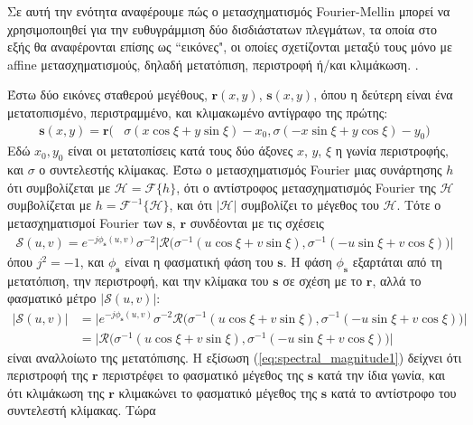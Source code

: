 Σε αυτή την ενότητα αναφέρουμε πώς ο μετασχηματισμός Fourier-Mellin μπορεί να
χρησιμοποιηθεί για την ευθυγράμμιση δύο δισδιάστατων πλεγμάτων, τα οποία στο
εξής θα αναφέρονται επίσης ως ``εικόνες", οι οποίες σχετίζονται μεταξύ τους μόνο
με affine μετασχηματισμούς, δηλαδή μετατόπιση, περιστροφή ή/και κλιμάκωση.
\cite{Casasent1976,Qin-ShengChen1994a,Reddy1996}.

Έστω δύο εικόνες σταθερού μεγέθους, $\bm{r}(x,y)$, $\bm{s}(x,y)$, όπου η
δεύτερη είναι ένα μετατοπισμένο, περιστραμμένο, και κλιμακωμένο αντίγραφο της
πρώτης:
\begin{align}
  \bm{s}(x,y) = \bm{r}\big( &\sigma(x \cos\xi + y \sin\xi) - x_0, \sigma(-x \sin\xi + y \cos\xi) -y_0 \big) \nonumber
\end{align}
Εδώ $x_0,y_0$ είναι οι μετατοπίσεις κατά τους δύο άξονες $x$, $y$, $\xi$ η
γωνία περιστροφής, και $\sigma$ ο συντελεστής κλίμακας. Έστω ο μετασχηματισμός
Fourier μιας συνάρτησης $h$ ότι συμβολίζεται με $\mathcal{H} =
\mathcal{F}\{h\}$, ότι ο αντίστροφος μετασχηματισμός Fourier της $\mathcal{H}$
συμβολίζεται με $h = \mathcal{F}^{-1}\{\mathcal{H}\}$, και ότι $|\mathcal{H}|$
συμβολίζει το μέγεθος του $\mathcal{H}$. Τότε ο μετασχηματισμοί Fourier των
$\bm{s}$, $\bm{r}$
συνδέονται με τις σχέσεις
\begin{align}
  \mathcal{S}(u,v) = e^{-j \phi_{\bm{s}}(u,v)} \sigma^{-2} \big| \mathcal{R} \big( \sigma^{-1}(u \cos\xi + v \sin\xi), \sigma^{-1}(-u \sin\xi + v \cos\xi) \big) \big| \nonumber
\end{align}
όπου $j^2 = -1$, και $\phi_{\bm{s}}$ είναι η φασματική φάση του $\bm{s}$.
Η φάση $\phi_{\bm{s}}$ εξαρτάται από τη μετατόπιση, την περιστροφή, και την
κλίμακα του $\bm{s}$ σε σχέση με το $\bm{r}$, αλλά το φασματικό μέτρο
$|\mathcal{S}(u,v)|$:
\begin{align}
  \big| \mathcal{S}(u,v) \big| &= \big| e^{-j \phi_{\bm{s}}(u,v)} \sigma^{-2} \mathcal{R} \big( \sigma^{-1}(u \cos\xi + v \sin\xi),
                                                                        \sigma^{-1}(-u \sin\xi + v \cos\xi) \big) \big| \nonumber \\
  &= \big| \mathcal{R} \big( \sigma^{-1}(u \cos\xi + v \sin\xi), \sigma^{-1}(-u \sin\xi + v \cos\xi) \big) \big| \label{eq:spectral_magnitude1}
\end{align}
είναι αναλλοίωτο της μετατόπισης. Η εξίσωση (\ref{eq:spectral_magnitude1})
δείχνει ότι περιστροφή της $\bm{r}$ περιστρέφει το φασματικό μέγεθος της
$\bm{s}$ κατά την ίδια γωνία, και ότι κλιμάκωση της $\bm{r}$ κλιμακώνει το
φασματικό μέγεθος της $\bm{s}$ κατά το αντίστροφο του συντελεστή κλίμακας. Τώρα
